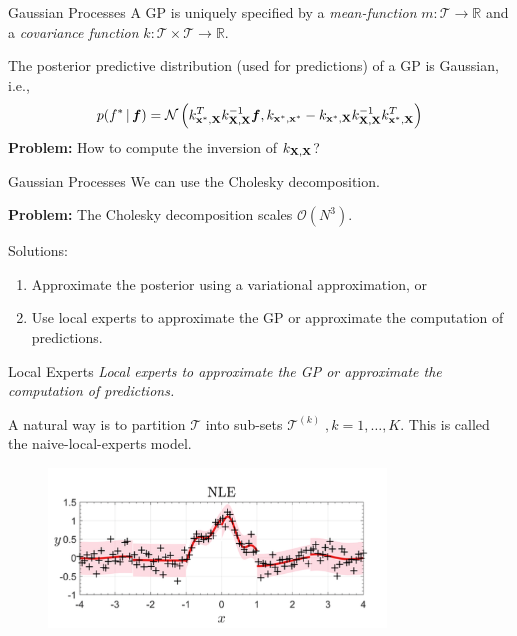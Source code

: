 \begin{frame}{Gaussian Processes}
A GP is uniquely specified by a \emph{mean-function} $m: \mathcal{T} \rightarrow \mathbb{R}$ and a \emph{covariance function} $k: \mathcal{T} \times \mathcal{T} \rightarrow \mathbb{R}$.

The posterior predictive distribution (used for predictions) of a GP is Gaussian, i.e.,
  \begin{equation}
    p(f^* \,|\, \bm f) = \mathcal{N}\left( k^T_{\mathbf{x}^{*},\mathbf{X}} k^{-1}_{\mathbf{X},\mathbf{X}} \bm f , k_{\mathbf{x}^{*},\mathbf{x}^{*}} - k_{\mathbf{x}^{*},\mathbf{X}} k^{-1}_{\mathbf{X},\mathbf{X}}k^T_{\mathbf{x}^{*},\mathbf{X}}   \right)
  \end{equation}
\textbf{Problem:} How to compute the inversion of $k_{\mathbf{X},\mathbf{X}}$?
\end{frame}


\begin{frame}{Gaussian Processes}
We can use the Cholesky decomposition. %

\textbf{Problem:} The Cholesky decomposition scales $\mathcal{O}(N^3)$.

Solutions:
\begin{enumerate}
  \item Approximate the posterior using a variational approximation, or
  \item Use local experts to approximate the GP or approximate the computation of predictions.
\end{enumerate}
\end{frame}

\begin{frame}{Local Experts}
\textit{Local experts to approximate the GP or approximate the computation of predictions.}

A natural way is to partition $\mathcal{T}$ into sub-sets $\mathcal{T}^{(k)} \; , k=1, \dots, K$. This is called the naive-local-experts model.
\begin{figure}
  \includegraphics[width=0.8\textwidth]{NLE}
\end{figure}
\end{frame}


